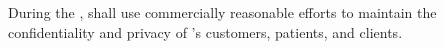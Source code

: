 During the \termOfLease, \lessor shall use commercially reasonable efforts to maintain the confidentiality and privacy of \lessee's customers, patients, and clients.

